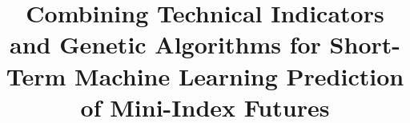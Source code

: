 \documentclass[conference]{IEEEtran}
\begin{document}
\title{Combining Technical Indicators and Genetic Algorithms for Short-Term Machine Learning Prediction of Mini-Index Futures \\
}

\end{document}
